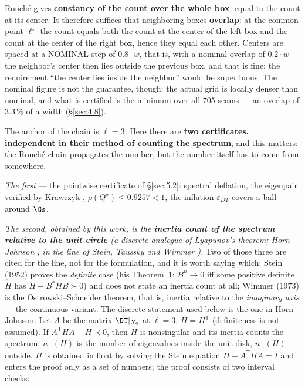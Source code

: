Rouché gives \textbf{constancy of the count over the whole box}, equal to the
count at its center. It therefore suffices that neighboring boxes
\textbf{overlap}: at the common point $\ell^{\star}$ the count equals both the count at
the center of the left box and the count at the center of the right box,
hence they equal each other. Centers are spaced at a NOMINAL step of $0.8\cdot w$, that is, with a nominal overlap of $0.2\cdot w$ --- the neighbor's center then lies outside the
previous box, and that is fine: the requirement ``the center lies inside the
neighbor'' would be superfluous. The nominal figure is not the guarantee, though: the actual grid is
locally denser than nominal, and what is certified is the minimum over all
705 seams --- an overlap of $3.3\,\%$ of a width (\S\ref{sec:4.8}).

The anchor of the chain is $\ell = 3$. Here there are \textbf{two certificates,
independent in their method of counting the spectrum}, and this matters:
the Rouché chain propagates the number, but the number itself has to come
from somewhere.

\emph{The first} --- the pointwise certificate of \S\ref{sec:5.2}: spectral deflation, the
eigenpair verified by Krawczyk \cite{krawczyk1969newton}, $\rho(Q^{\star}) \le 0.9257 < 1$, the inflation $\varepsilon_{DT}$
covers a ball around $\Gs$.

\emph{The second, obtained by this work, is the \textbf{inertia count of the spectrum
relative to the unit circle} (a discrete analogue of Lyapunov's theorem;
Horn--Johnson \cite[Ch.~2]{horn1991topics}, in the line of
Stein, Taussky and Wimmer \cite{stein1952theorems, taussky1964matrices, wimmer1973ostrowski}).}
Two of those three are cited for the line, not for the formulation, and it is
worth saying which: Stein (1952) proves the \emph{definite} case (his Theorem~1:
$B^{n}\to 0$ iff some positive definite $H$ has $H - B^{*}HB \succ 0$) and does not
state an inertia count at all; Wimmer (1973) is the Ostrowski--Schneider theorem,
that is, inertia relative to the \emph{imaginary axis} --- the continuous variant.
The discrete statement used below is the one in Horn--Johnson. Let $A$ be the matrix $\DT|_{X_{0}}$
at $\ell = 3$, $H = H^{\mathsf{T}}$ (definiteness is not assumed). If $A^{\mathsf{T}}HA - H \prec 0$, then
$H$ is nonsingular and its inertia counts the spectrum: $n_{+}(H)$ is the
number of eigenvalues inside the unit disk, $n_{-}(H)$ --- outside. $H$ is
obtained in float by solving the Stein equation $H - A^{\mathsf{T}}HA = I$ and enters
the proof only as a set of numbers; the proof consists of two interval
checks:

